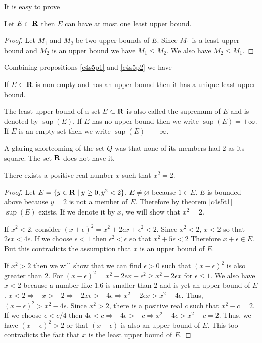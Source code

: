 It is easy to prove
\begin{prop}\label{c4s5p2}
Let $E \subset \mathbf{R}$ then $E$ can have at most one least upper bound.
\end{prop}
\begin{proof}
Let $M_1$ and $M_2$ be two upper bounds of $E$. Since $M_1$ is a least 
upper bound and $M_2$ is an upper bound we have $M_1 \le M_2$. We also
have $M_2 \le M_1$.
\end{proof}

Combining propositions \ref{c4s5p1} and \ref{c4s5p2} we have
\begin{thm}\label{c4s5t1}
If $E \subset \mathbf{R}$ is non-empty and has an upper bound then it has a 
unique least upper bound.
\end{thm}

The least upper bound of a set $E \subset \mathbf{R}$ is also called
the supremum of $E$ and is denoted by $\sup(E)$. If $E$ has no upper bound
then we write $\sup(E) = +\infty$. If $E$ is an empty set then we write
$\sup(E) - -\infty$.

A glaring shortcoming of the set $Q$ was that none of its members had
$2$ as its square. The set $\mathbf{R}$ does not have it.
\begin{prop}\label{c4s5p3}
There exists a positive real number $x$ such that $x^2 = 2$.
\end{prop}
\begin{proof}
Let $E = \{y \in \mathbf{R} \;|\; y \ge 0, y^2 < 2\}$. $E \ne \varnothing$
because $1 \in E$. $E$ is bounded above because $y = 2$ is not a member
of $E$. Therefore by theorem \ref{c4s5t1} $\sup(E)$ exists. If we denote it
by $x$, we will show that $x^2 = 2$.

If $x^2 < 2$, consider $(x + \epsilon)^2 = x^2 + 2\epsilon x + \epsilon^2
< 2$. Since $x^2 < 2$, $x < 2$ so that $2\epsilon x < 4\epsilon$. If we 
choose $\epsilon < 1$ then $\epsilon^2 < \epsilon$ so that
$x^2 + 5\epsilon < 2$ Therefore $x + \epsilon \in E$. But this contradicts
the assumption that $x$ is an upper bound of $E$.

If $x^2 > 2$ then we will show that we can find $\epsilon > 0$ such that
$(x - \epsilon)^2$ is also greater than $2$. For $(x - \epsilon)^2 =
x^2 - 2\epsilon x + \epsilon^2 \ge x^2 - 2\epsilon x$ for $\epsilon \le 1$.
We also have $x < 2$ because a number like $1.6$ is smaller than $2$ and is
yet an upper bound of $E$. $x < 2 \Rightarrow -x > -2 \Rightarrow -2x
\epsilon > -4\epsilon \Rightarrow x^2 - 2\epsilon x > x^2 - 4\epsilon$.
Thus, $(x - \epsilon)^2 > x^2 - 4\epsilon$. Since $x^2 > 2$, there is a
positive real $c$ such that $x^2 - c = 2$. If we choose $\epsilon < c/4$
then $4\epsilon < c \Rightarrow -4\epsilon > -c \Rightarrow x^2 - 4\epsilon
> x^2 - c = 2$. Thus, we have $(x - \epsilon)^2 > 2$ or that $(x-\epsilon)$
is also an upper bound of $E$. This too contradicts the fact that $x$ is
the least upper bound of $E$.
\end{proof}

